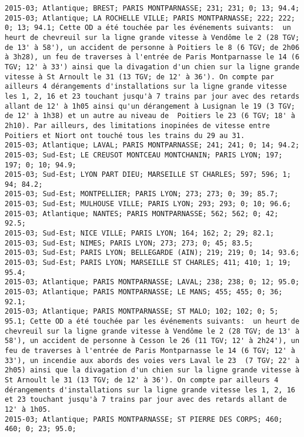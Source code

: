 \documentclass{article}
\begin{document}
\begin{Verbatim}[commandchars=\\\{\}]
2015-03; Atlantique; BREST; PARIS MONTPARNASSE; 231; 231; 0; 13; 94.4; 
2015-03; Atlantique; LA ROCHELLE VILLE; PARIS MONTPARNASSE; 222; 222; 0; 13; 94.1; Cette OD a été touchée par les événements suivants:  un heurt de chevreuil sur la ligne grande vitesse à Vendôme le 2 (28 TGV; de 13' à 58'), un accident de personne à Poitiers le 8 (6 TGV; de 2h06 à 3h28), un feu de traverses à l'entrée de Paris Montparnasse le 14 (6 TGV; 12' à 33') ainsi que la divagation d'un chien sur la ligne grande vitesse à St Arnoult le 31 (13 TGV; de 12' à 36'). On compte par ailleurs 4 dérangements d'installations sur la ligne grande vitesse les 1, 2, 16 et 23 touchant jusqu'à 7 trains par jour avec des retards allant de 12' à 1h05 ainsi qu'un dérangement à Lusignan le 19 (3 TGV; de 12' à 1h38) et un autre au niveau de  Poitiers le 23 (6 TGV; 18' à 2h10). Par ailleurs, des limitations inopinées de vitesse entre Poitiers et Niort ont touché tous les trains du 29 au 31.
2015-03; Atlantique; LAVAL; PARIS MONTPARNASSE; 241; 241; 0; 14; 94.2; 
2015-03; Sud-Est; LE CREUSOT MONTCEAU MONTCHANIN; PARIS LYON; 197; 197; 0; 10; 94.9; 
2015-03; Sud-Est; LYON PART DIEU; MARSEILLE ST CHARLES; 597; 596; 1; 94; 84.2; 
2015-03; Sud-Est; MONTPELLIER; PARIS LYON; 273; 273; 0; 39; 85.7; 
2015-03; Sud-Est; MULHOUSE VILLE; PARIS LYON; 293; 293; 0; 10; 96.6; 
2015-03; Atlantique; NANTES; PARIS MONTPARNASSE; 562; 562; 0; 42; 92.5; 
2015-03; Sud-Est; NICE VILLE; PARIS LYON; 164; 162; 2; 29; 82.1; 
2015-03; Sud-Est; NIMES; PARIS LYON; 273; 273; 0; 45; 83.5; 
2015-03; Sud-Est; PARIS LYON; BELLEGARDE (AIN); 219; 219; 0; 14; 93.6; 
2015-03; Sud-Est; PARIS LYON; MARSEILLE ST CHARLES; 411; 410; 1; 19; 95.4; 
2015-03; Atlantique; PARIS MONTPARNASSE; LAVAL; 238; 238; 0; 12; 95.0; 
2015-03; Atlantique; PARIS MONTPARNASSE; LE MANS; 455; 455; 0; 36; 92.1; 
2015-03; Atlantique; PARIS MONTPARNASSE; ST MALO; 102; 102; 0; 5; 95.1; Cette OD a été touchée par les événements suivants:  un heurt de chevreuil sur la ligne grande vitesse à Vendôme le 2 (28 TGV; de 13' à 58'), un accident de personne à Cesson le 26 (11 TGV; 12' à 2h24'), un feu de traverses à l'entrée de Paris Montparnasse le 14 (6 TGV; 12' à 33'), un incendie aux abords des voies vers Laval le 23  (7 TGV; 22' à 2h05) ainsi que la divagation d'un chien sur la ligne grande vitesse à St Arnoult le 31 (13 TGV; de 12' à 36'). On compte par ailleurs 4 dérangements d'installations sur la ligne grande vitesse les 1, 2, 16 et 23 touchant jusqu'à 7 trains par jour avec des retards allant de 12' à 1h05.
2015-03; Atlantique; PARIS MONTPARNASSE; ST PIERRE DES CORPS; 460; 460; 0; 23; 95.0; 

\end{Verbatim}
\end{document}

